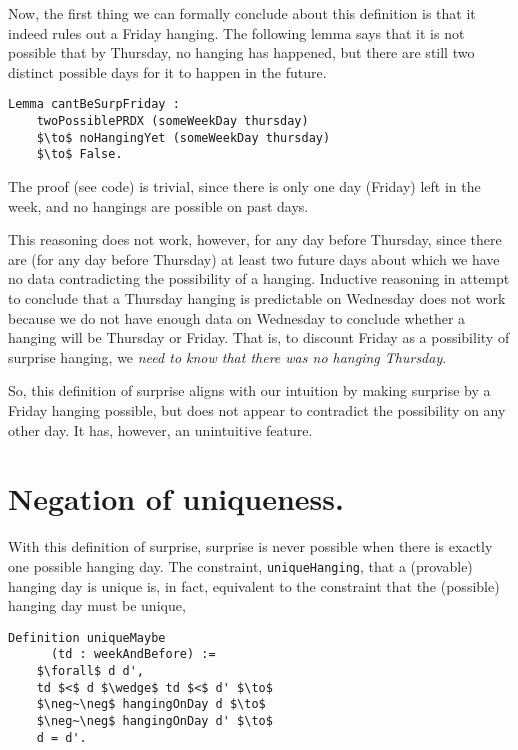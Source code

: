 \documentclass[journal]{journal}
\begin{document}
Now, the first thing we can formally conclude about this definition is that it indeed rules out
a Friday hanging. The following lemma says that it is not possible that by Thursday,
no hanging has happened, but there are still two distinct possible days for it to
happen in the future.

\begin{lstlisting}[mathescape=true]
  Lemma cantBeSurpFriday :
    twoPossiblePRDX (someWeekDay thursday)
    $\to$ noHangingYet (someWeekDay thursday)
    $\to$ False.
\end{lstlisting}

The proof (see code) is trivial, since there is only one day (Friday) left in the week,
and no hangings are possible on past days.

This reasoning does not work, however, for any
day before Thursday, since there are (for any day before Thursday) at least two future
days about which we have no
data contradicting the possibility of a hanging.
Inductive reasoning in attempt to conclude that a Thursday hanging is
predictable on Wednesday does not work because we do not have enough data on Wednesday
to conclude whether a hanging will be Thursday or Friday. That is, to discount Friday
as a possibility of surprise hanging, we \emph{need to know that there was no
hanging Thursday}.

So, this definition of surprise aligns with our intuition by making surprise
by a Friday hanging possible, but does not appear to contradict the possibility
on any other day. It has, however, an unintuitive feature.

\section{Negation of uniqueness. }
\label{sec:unique}

With this definition of surprise, surprise is never possible when there is
exactly one possible hanging day. The constraint, {\tt uniqueHanging}, that
a (provable) hanging day is unique is, in fact, equivalent to the constraint
that the (possible) hanging day must be unique,

\begin{lstlisting}[mathescape=true]
  Definition uniqueMaybe
      (td : weekAndBefore) :=
    $\forall$ d d',
    td $<$ d $\wedge$ td $<$ d' $\to$
    $\neg~\neg$ hangingOnDay d $\to$
    $\neg~\neg$ hangingOnDay d' $\to$
    d = d'.
\end{lstlisting}
\end{document}
